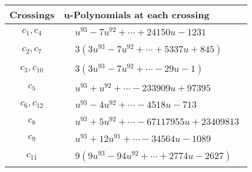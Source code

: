 \documentclass[1p]{elsarticle_modified}
\theoremstyle{definition}
\begin{document}
\begin{tabular}{m{50pt}|m{274pt}}
Crossings & \hspace{64pt}u-Polynomials at each crossing \\
\hline $$\begin{aligned}c_{1},c_{4}\end{aligned}$$&$\begin{aligned}
&u^{93}-7 u^{92}+\cdots+24150 u-1231
\end{aligned}$\\
\hline $$\begin{aligned}c_{2},c_{7}\end{aligned}$$&$\begin{aligned}
&3(3 u^{93}-7 u^{92}+\cdots+5337 u+845)
\end{aligned}$\\
\hline $$\begin{aligned}c_{3},c_{10}\end{aligned}$$&$\begin{aligned}
&3(3 u^{93}-7 u^{92}+\cdots-29 u-1)
\end{aligned}$\\
\hline $$\begin{aligned}c_{5}\end{aligned}$$&$\begin{aligned}
&u^{93}+u^{92}+\cdots-233909 u+97395
\end{aligned}$\\
\hline $$\begin{aligned}c_{6},c_{12}\end{aligned}$$&$\begin{aligned}
&u^{93}-4 u^{92}+\cdots-4518 u-713
\end{aligned}$\\
\hline $$\begin{aligned}c_{8}\end{aligned}$$&$\begin{aligned}
&u^{93}+5 u^{92}+\cdots-67117955 u+23409813
\end{aligned}$\\
\hline $$\begin{aligned}c_{9}\end{aligned}$$&$\begin{aligned}
&u^{93}+12 u^{91}+\cdots-34564 u-1089
\end{aligned}$\\
\hline $$\begin{aligned}c_{11}\end{aligned}$$&$\begin{aligned}
&9(9 u^{93}-94 u^{92}+\cdots+2774 u-2627)
\end{aligned}$\\
\hline
\end{tabular}\\~\\
\end{document}
